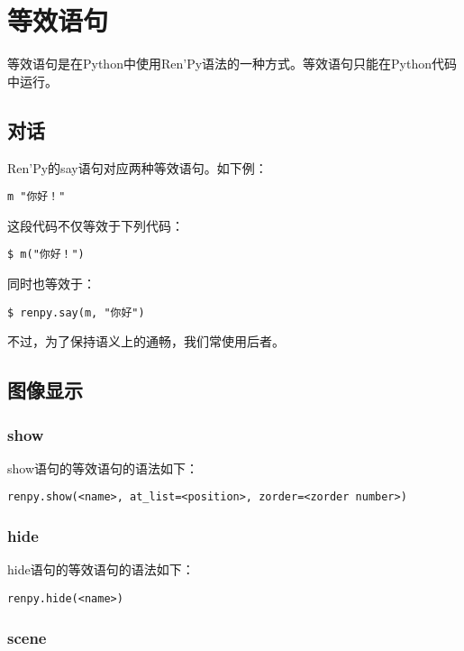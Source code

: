 \section{等效语句}
等效语句是在Python中使用Ren'Py语法的一种方式。等效语句只能在Python代码中运行。

\subsection{对话}
Ren'Py的say语句对应两种等效语句。如下例：

\begin{lstlisting}
m "你好！"
\end{lstlisting}

这段代码不仅等效于下列代码：

\begin{lstlisting}
$ m("你好！")
\end{lstlisting}

同时也等效于：

\begin{lstlisting}
$ renpy.say(m, "你好")
\end{lstlisting}

不过，为了保持语义上的通畅，我们常使用后者。

\subsection{图像显示}

\subsubsection{show}

show语句的等效语句的语法如下：

\begin{lstlisting}
renpy.show(<name>, at_list=<position>, zorder=<zorder number>)
\end{lstlisting}

\subsubsection{hide}

hide语句的等效语句的语法如下：

\begin{lstlisting}
renpy.hide(<name>)
\end{lstlisting}

\subsubsection{scene}

